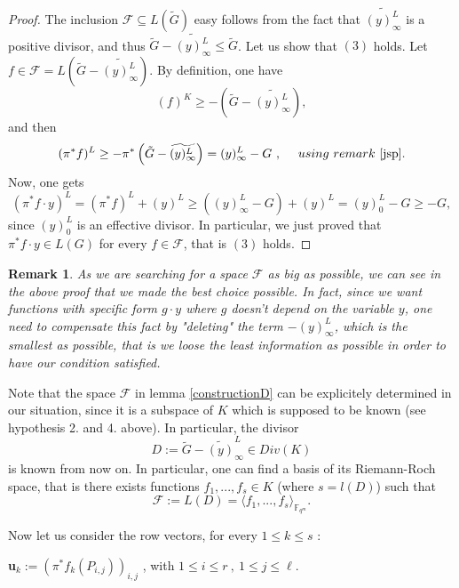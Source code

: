 \documentclass[10pt]{article}
\newtheorem{rq1}{Remark}[]
\newcommand{\s}{\vspace{0.3cm}}
\newcommand{\cd}{\cdot}
\newcommand{\fqm}{\mathbb{F}_{q^m}}
\newcommand{\su}{\subseteq}
\begin{document}
\s

\begin{proof}
The inclusion $\mathcal{F} \su L(\tilde{G})$ easy follows from the fact that $\widetilde{(y)^L_{\infty}}$ is a positive divisor, and thus $\tilde{G}-\widetilde{(y)^L_{\infty}} \leq \tilde{G}$. Let us show that $(3)$ holds. Let $f \in \mathcal{F} =  L\left(\tilde{G}-\widetilde{(y)^L_{\infty}}\right)$. By definition, one have 
\[(f)^K \geq -\left(\tilde{G}-\widetilde{(y)^L_{\infty}}\right),\]
and then 
\[(\pi^*f)^L \geq -\pi^*\left(\tilde{G}-\widetilde{(y)^L_{\infty}}\right) = (y)^L_{\infty} - G \ , \ \quad using \ remark \ \ref{jsp}.\]
Now, one gets 
\[(\pi^*f \cd y)^L = (\pi^*f)^L  + (y)^L \geq  ((y)^L_{\infty} - G)+(y)^L = (y)^L_0 - G \geq -G,\]
since $(y)^L_0$ is an effective divisor. In particular, we just proved that $\pi^*f \cd y \in L(G)$ for every $f \in \mathcal{F}$, that is $(3)$ holds.
\end{proof}

\s

\begin{rq1} \rm \label{remark5}
As we are searching for a space $\mathcal{F}$ as big as possible, we can see in the above proof that we made the best choice possible. In fact, since we want functions with specific form $g \cd y$ where $g$ doesn't depend on the variable $y$, one need to compensate this fact by "deleting" the term $-(y)^L_{\infty}$, which is the smallest as possible, that is we loose the least information as possible in order to have our condition satisfied. 
\end{rq1}

\s

Note that the space $\mathcal{F}$ in lemma \ref{constructionD} can be explicitely determined in our situation, since it is a subspace of $K$ which is supposed to be known (see hypothesis 2. and 4. above). In particular, the divisor 
\begin{equation}
D := \tilde{G} - \widetilde{(y)}^L_{\infty} \in Div(K)
\end{equation}
is known from now on. In particular, one can find a basis of its Riemann-Roch space, that is there exists functions $f_1,...,f_s \in K$ (where $s=l(D)$) such that 
\[\mathcal{F} := L(D) = \langle f_1,...,f_s \rangle_{\fqm}.\]

Now let us consider the row vectors, for every $1 \leq k \leq s$ :
\begin{center}
\textbf{u}$_{k}:= \left(\pi^*f_k(P_{i,j})\right)_{i,j}$ , with $1 \leq i \leq r \ , \ 1 \leq j \leq \ell$.
\end{center}
\end{document}
